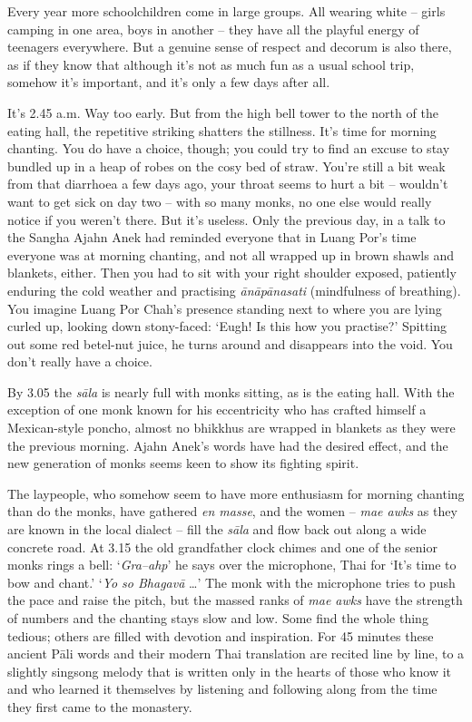 Every year more schoolchildren come in large groups. All wearing white
-- girls camping in one area, boys in another -- they have all the
playful energy of teenagers everywhere. But a genuine sense of respect
and decorum is also there, as if they know that although it's not as
much fun as a usual school trip, somehow it's important, and it's only a
few days after all. 

It's 2.45 a.m. Way too early. But from the high bell tower to the north
of the eating hall, the repetitive striking shatters the stillness. It's
time for morning chanting. You do have a choice, though; you could try
to find an excuse to stay bundled up in a heap of robes on the cosy bed
of straw. You're still a bit weak from that diarrhoea a few days ago, 
your throat seems to hurt a bit -- wouldn't want to get sick on day two
-- with so many monks, no one else would really notice if you weren't
there. But it's useless. Only the previous day, in a talk to the Sangha
Ajahn Anek had reminded everyone that in Luang Por's time everyone was
at morning chanting, and not all wrapped up in brown shawls and
blankets, either. Then you had to sit with your right shoulder exposed, 
patiently enduring the cold weather and practising \emph{ānāpānasati}
 (mindfulness of breathing). You imagine Luang Por Chah's presence
standing next to where you are lying curled up, looking down
stony-faced: `Eugh! Is this how you practise?' Spitting out some red
betel-nut juice, he turns around and disappears into the void. You don't
really have a choice. 

By 3.05 the \emph{sāla} is nearly full with monks sitting, as is the eating
hall. With the exception of one monk known for his eccentricity who has
crafted himself a Mexican-style poncho, almost no bhikkhus are wrapped
in blankets as they were the previous morning. Ajahn Anek's words have
had the desired effect, and the new generation of monks seems keen to
show its fighting spirit. 

The laypeople, who somehow seem to have more enthusiasm for morning
chanting than do the monks, have gathered \emph{en masse}, and the women
-- \emph{mae awks} as they are known in the local dialect -- fill the
\emph{sāla} and flow back out along a wide concrete road. At 3.15 the old
grandfather clock chimes and one of the senior monks rings a bell: 
`\emph{Gra--ahp}' he says over the microphone, Thai for `It's time to
bow and chant.' `\emph{Yo so Bhagavā} \ldots{}' The monk with the
microphone tries to push the pace and raise the pitch, but the massed
ranks of \emph{mae awks} have the strength of numbers and the chanting
stays slow and low. Some find the whole thing tedious; others are filled
with devotion and inspiration. For 45 minutes these ancient Pāli words
and their modern Thai translation are recited line by line, to a
slightly singsong melody that is written only in the hearts of those who
know it and who learned it themselves by listening and following along
from the time they first came to the monastery. 

